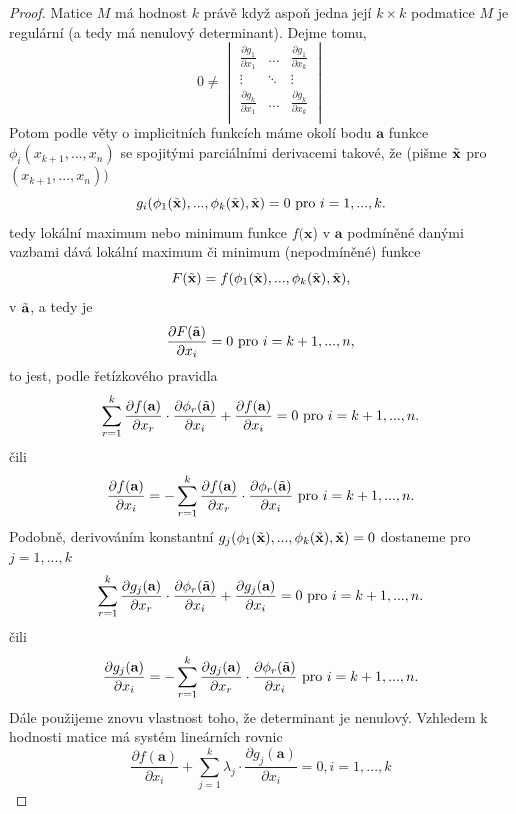 \documentclass[../main.tex]{subfiles}
\begin{document}
\begin{proof}
	Matice $M$ má hodnost $k$ právě když aspoň jedna její $k\times k$ podmatice $M$ je regulární (a tedy má nenulový determinant). Dejme tomu,
	\[ 0 \neq \begin{vmatrix}
	\frac{\partial g_1}{\partial x_1} & \dots & \frac{\partial g_1}{\partial x_k}\\
	\vdots & \ddots & \vdots\\
	\frac{\partial g_k}{\partial x_1} & \dots & \frac{\partial g_k}{\partial x_k}\\
	\end{vmatrix}\]
	Potom podle věty o implicitních funkcích máme okolí bodu $\textbf{a}$ funkce $\phi_i(x_{k+1},...,x_n)$
	se spojitými parciálními derivacemi takové, že (pišme $\Tilde{\textbf{x}}$ pro $(x_{k+1},...,x_n))$
	\[g_i(\phi_1(\Tilde{\textbf{x}}),...,\phi_k(\Tilde{\textbf{x}}),\Tilde{\textbf{x}}) = 0 \text{ pro } i=1,...,k.\]
	tedy lokální maximum nebo minimum funkce $f(\textbf{x}$) v $\textbf{a}$ podmíněné danými vazbami dává lokální maximum či minimum (nepodmíněné) funkce
	\[F(\Tilde{\textbf{x}}) = f(\phi_1(\Tilde{\textbf{x}}),...,\phi_k(\Tilde{\textbf{x}}),\Tilde{\textbf{x}}),\]
	v $\Tilde{\textbf{a}}$, a tedy je 
	\[\frac{\partial F(\Tilde{\textbf{a}})}{\partial x_i} = 0 \text{ pro } i = k+1,...,n,\]
	to jest, podle řetízkového pravidla
	\[\sum^k_{r=1}\frac{\partial f(\textbf{a})}{\partial x_r}\cdot \frac{\partial \phi_r(\Tilde{\textbf{a}})}{\partial x_i} + \frac{\partial f(\textbf{a})}{\partial x_i} = 0 \text{ pro } i = k+1,...,n.\]
	čili
	\[\frac{\partial f(\textbf{a})}{\partial x_i} = -\sum^k_{r=1}\frac{\partial f(\textbf{a})}{\partial x_r}\cdot \frac{\partial \phi_r(\Tilde{\textbf{a}})}{\partial x_i} \text{ pro } i = k+1,...,n.\]
	Podobně, derivováním konstantní $g_j(\phi_1(\Tilde{\textbf{x}}),...,\phi_k(\Tilde{\textbf{x}}),\Tilde{\textbf{x}}) = 0$ dostaneme pro $j = 1,...,k$
	\[\sum^k_{r=1}\frac{\partial g_j(\textbf{a})}{\partial x_r}\cdot \frac{\partial \phi_r(\Tilde{\textbf{a}})}{\partial x_i} + \frac{\partial g_j(\textbf{a})}{\partial x_i}=0 \text{ pro } i = k+1,...,n.\]
    čili
    \[\frac{\partial g_j(\textbf{a})}{\partial x_i}=-\sum^k_{r=1}\frac{\partial g_j(\textbf{a})}{\partial x_r}\cdot \frac{\partial \phi_r(\Tilde{\textbf{a}})}{\partial x_i} \text{ pro } i = k+1,...,n.\]
	Dále použijeme znovu vlastnost toho, že determinant je nenulový. Vzhledem k hodnosti matice má systém lineárních rovnic
	\[\frac{\partial f(\textbf{a})}{\partial x_i} + \sum^k_{j=1}\lambda_j\cdot\frac{\partial g_j(\textbf{a})}{\partial x_i} = 0, i = 1,...,k\]

\end{proof}
\end{document}

